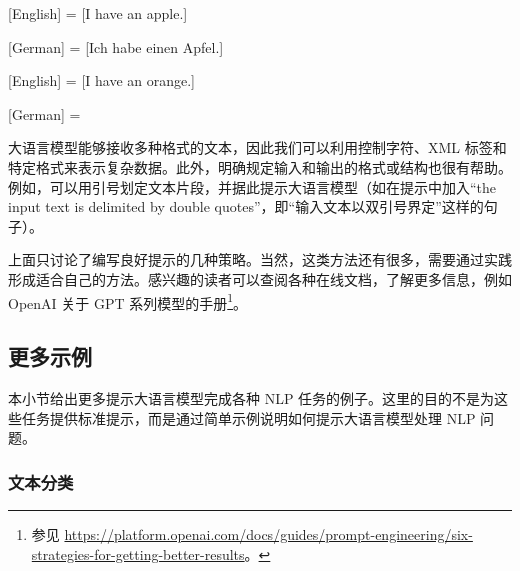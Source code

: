 \begin{itemize}
    \vspace{0.5em}
    \begin{tcolorbox}

    \begingroup
    \setlength{\leftskip}{2em}
    \setlength{\rightskip}{2em}

    [English] = [I have an apple.]

    \vspace{0.3em}

    [German] = [Ich habe einen Apfel.]

    \vspace{0.3em}

    [English] = [I have an orange.]

    \vspace{0.3em}

    [German] = \underline{\hspace{2em}}

    \endgroup

    \end{tcolorbox}
    \vspace{0.5em}

    大语言模型能够接收多种格式的文本，因此我们可以利用控制字符、XML 标签和特定格式来表示复杂数据。此外，明确规定输入和输出的格式或结构也很有帮助。例如，可以用引号划定文本片段，并据此提示大语言模型（如在提示中加入“the input text is delimited by double quotes”，即“输入文本以双引号界定”这样的句子）。

\end{itemize}
\vspace{0.5em}

上面只讨论了编写良好提示的几种策略。当然，这类方法还有很多，需要通过实践形成适合自己的方法。感兴趣的读者可以查阅各种在线文档，了解更多信息，例如 OpenAI 关于 GPT 系列模型的手册\footnote{参见 \url{https://platform.openai.com/docs/guides/prompt-engineering/six-strategies-for-getting-better-results}。}。

\subsection{更多示例}

\noindent 本小节给出更多提示大语言模型完成各种 NLP 任务的例子。这里的目的不是为这些任务提供标准提示，而是通过简单示例说明如何提示大语言模型处理 NLP 问题。

\subsubsection{文本分类}

